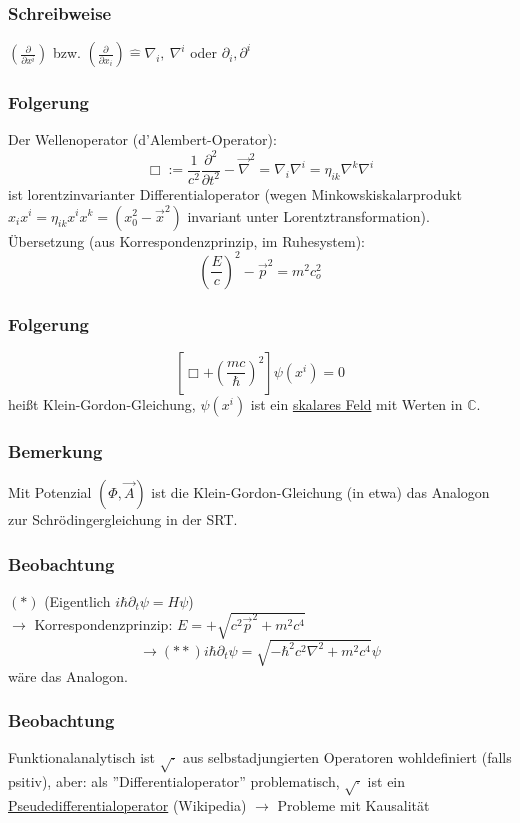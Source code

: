 \documentclass[twoside,a4paper]{scrartcl}
\newcommand{\C}{\mathbb{C}}
\renewcommand{\1}{\mathds{1}}
\newcommand{\ra}{\rightarrow}
\newcommand{\entspricht}{\mathrel{\widehat{=}}}
\renewcommand{\C}{\mathbb{C}}
\begin{document}
\subsubsection*{Schreibweise}
$(\frac{\partial}{\partial x^i})$ bzw. $(\frac{\partial}{\partial x_i})\entspricht \nabla_i, \ \nabla^i$ oder $\partial_i,\partial^i$

\subsubsection*{Folgerung}
Der Wellenoperator (d'Alembert-Operator):
$$\Box:= \frac{1}{c^2} \frac{\partial^2}{\partial t^2}-\vec \nabla^2=\nabla_i\nabla^i=\eta_{ik} \nabla^k \nabla^i$$
ist lorentzinvarianter Differentialoperator (wegen Minkowskiskalarprodukt $x_ix^i=\eta_{ik}x^ix^k=(x_0^2-\vec x^2)$ invariant unter Lorentztransformation).\\
Übersetzung (aus Korrespondenzprinzip, im Ruhesystem):
$$\left (\frac{E}{c} \right)^2-\vec p^2=m^2c_o^2$$
\subsubsection*{Folgerung}
$$[\Box+(\frac{mc}{\hbar})^2] \psi(x^i)=0$$
heißt Klein-Gordon-Gleichung, $\psi(x^i)$ ist ein \underline{skalares Feld} mit Werten in $\C$.
\subsubsection*{Bemerkung}
Mit Potenzial $(\Phi,\vec A)$ ist die Klein-Gordon-Gleichung (in etwa) das Analogon zur Schrödingergleichung in der SRT.
\subsubsection*{Beobachtung}
$(*)$ (Eigentlich $i\hbar \partial_t \psi=H\psi$)\\
$\ra$ Korrespondenzprinzip: $E=+\sqrt{c^2\vec p^2+m^2c^4}$
$$\ra (**) i\hbar \partial_t \psi= \sqrt{-\hbar^2c^2\nabla^2+m^2c^4}\psi $$
wäre das Analogon.
\subsubsection*{Beobachtung}
Funktionalanalytisch ist $\sqrt{\cdot}$ aus selbstadjungierten Operatoren wohldefiniert (falls psitiv), aber:
als ''Differentialoperator'' problematisch, $\sqrt{\cdot}$ ist ein \underline{Pseudedifferentialoperator} (Wikipedia) $\ra$ Probleme mit Kausalität

% 
\end{document}
